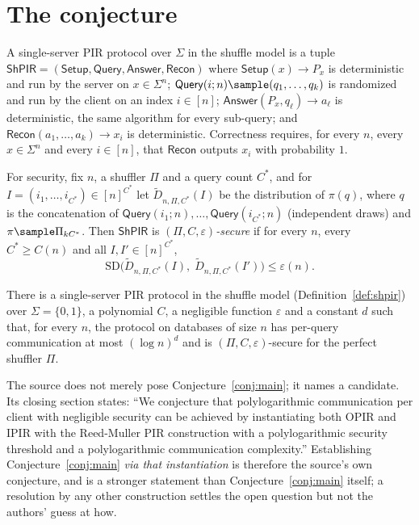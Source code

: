 \documentclass{conjura-conjecture}
\newcommand{\Sig}{\Sigma}
\newcommand{\eps}{\varepsilon}
\newcommand{\SD}{\mathrm{SD}}
\newcommand{\ShPIR}{\mathsf{ShPIR}}
\newcommand{\Query}{\mathsf{Query}}
\newcommand{\Answer}{\mathsf{Answer}}
\newcommand{\Setup}{\mathsf{Setup}}
\newcommand{\Recon}{\mathsf{Recon}}
\begin{document}
\section{The conjecture}\label{sec:conjectures}

\begin{definition}\label{def:shpir}
A single-server PIR protocol over $\Sig$ in the shuffle model is a tuple
$\ShPIR = (\Setup, \Query, \Answer, \Recon)$ where $\Setup(x) \to P_{x}$
is deterministic and run by the server on $x \in \Sig^{n}$; $\Query(i;n)
\sample (q_{1}, \dots, q_{k})$ is randomized and run by the client on an
index $i \in [n]$; $\Answer(P_{x}, q_{\ell}) \to a_{\ell}$ is
deterministic, the same algorithm for every sub-query; and
$\Recon(a_{1}, \dots, a_{k}) \to x_{i}$ is deterministic. Correctness
requires, for every $n$, every $x \in \Sig^{n}$ and every $i \in [n]$,
that $\Recon$ outputs $x_{i}$ with probability $1$.

For security, fix $n$, a shuffler $\Pi$ and a query count $C^{*}$, and
for $I = (i_{1}, \dots, i_{C^{*}}) \in [n]^{C^{*}}$ let
$\widetilde{D}_{n,\Pi,C^{*}}(I)$ be the distribution of $\pi(q)$, where
$q$ is the concatenation of $\Query(i_{1};n), \dots,
\Query(i_{C^{*}};n)$ (independent draws) and $\pi \sample \Pi_{k
C^{*}}$. Then $\ShPIR$ is \emph{$(\Pi, C, \eps)$-secure} if for every
$n$, every $C^{*} \ge C(n)$ and all $I, I' \in [n]^{C^{*}}$,
\[
  \SD\bigl( \widetilde{D}_{n,\Pi,C^{*}}(I),\;
  \widetilde{D}_{n,\Pi,C^{*}}(I') \bigr) \le \eps(n).
\]
\end{definition}

\begin{conjecture}\label{conj:main}
There is a single-server PIR protocol in the shuffle model
(Definition~\ref{def:shpir}) over $\Sig = \{0,1\}$, a polynomial $C$, a
negligible function $\eps$ and a constant $d$ such that, for every $n$,
the protocol on databases of size $n$ has per-query communication at
most $(\log n)^{d}$ and is $(\Pi, C, \eps)$-secure for the perfect
shuffler $\Pi$.
\end{conjecture}

\begin{remark}
The source does not merely pose Conjecture~\ref{conj:main}; it names a
candidate. Its closing section states: ``We conjecture that
polylogarithmic communication per client with negligible security can be
achieved by instantiating both OPIR and IPIR with the Reed-Muller PIR
construction with a polylogarithmic security threshold and a
polylogarithmic communication complexity.'' Establishing
Conjecture~\ref{conj:main} \emph{via that instantiation} is therefore
the source's own conjecture, and is a stronger statement than
Conjecture~\ref{conj:main} itself; a resolution by any other
construction settles the open question but not the authors' guess at how.
\end{remark}
\end{document}
